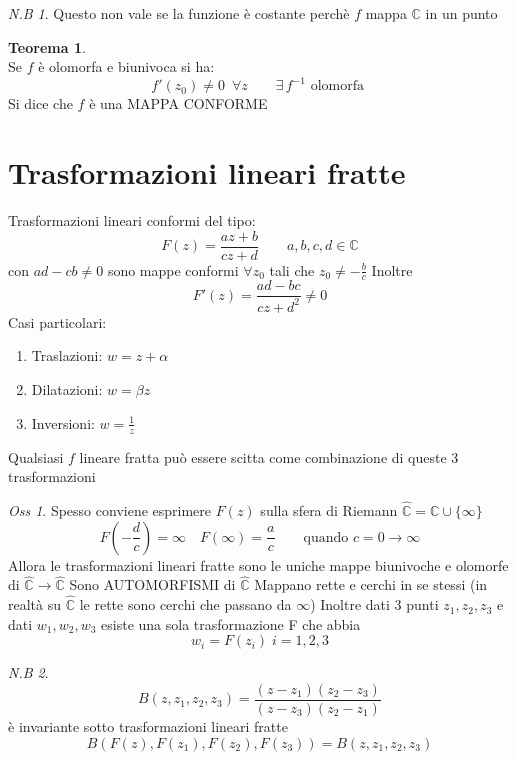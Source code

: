 \documentclass[a4paper,11pt]{report}
\theoremstyle{remark}
\newtheorem*{oss}{Oss}
\newtheorem*{nb}{N.B}
\theoremstyle{definition}
\newtheorem*{teo}{Teorema}
\newcommand{\C}{\mathbb{C}}
\begin{document}
	\begin{nb}
		Questo non vale se la funzione è costante perchè $f$ mappa $\C$ in un punto
	\end{nb}

	\begin{teo}\hfil\\
		Se $f$ è olomorfa e biunivoca si ha: 
		\[f'(z_0) \neq 0\ \; \forall z  \qquad \exists \, f^{-1} \text{ olomorfa }\]
		Si dice che $f$ è una MAPPA CONFORME
	\end{teo}

\section{Trasformazioni lineari fratte}
	Trasformazioni lineari conformi del tipo:
	\[F(z) = \frac{az + b}{cz + d} \qquad a,b,c,d \in \C\]
	con $ad-cb \neq 0$ sono mappe conformi $\forall z_0$ tali che $z_0 \neq -\frac{b}{c}$ \newline
	Inoltre
	\[F'(z) = \frac{ad-bc}{{cz+d}^2} \neq 0 \]
	Casi particolari:
	\begin{enumerate}
		\item Traslazioni: \qquad $w = z + \alpha$
		\item Dilatazioni: \qquad $w = \beta z$
		\item Inversioni:  \qquad $w = \frac{1}{z}$
	\end{enumerate}
	Qualsiasi $f$ lineare fratta può essere scitta come combinazione di queste 3 trasformazioni
	\begin{oss}
		Spesso conviene esprimere $F(z)$ sulla sfera di Riemann $\hat{\C} = \C \cup \{\infty\}$
		\[F\left(-\frac{d}{c}\right) = \infty \quad F(\infty) = \frac{a}{c} \qquad \text{quando } c=0 \to \infty\]
		Allora le trasformazioni lineari fratte sono le uniche mappe biunivoche e olomorfe di $\hat{\C} \rightarrow \hat{\C}$ \newline
		Sono AUTOMORFISMI  di $\hat{\C}$ \newline
		Mappano rette e cerchi in se stessi (in realtà su $\hat{\C}$ le rette sono cerchi che passano da $\infty$) \newline
		Inoltre dati 3 punti $z_1,z_2,z_3$ e dati $w_1,w_2,w_3$ esiste una sola trasformazione F che abbia 
		\[w_i = F(z_i) \; i=1,2,3\]	
	\end{oss}
	\begin{nb}
		\[B(z,z_1,z_2,z_3) = \frac{(z-z_1)(z_2-z_3)}{(z-z_3)(z_2-z_1)}\]
		è invariante sotto trasformazioni lineari fratte
		\[B(F(z),F(z_1),F(z_2),F(z_3)) = B (z,z_1,z_2,z_3)\]
	\end{nb}
\end{document}
